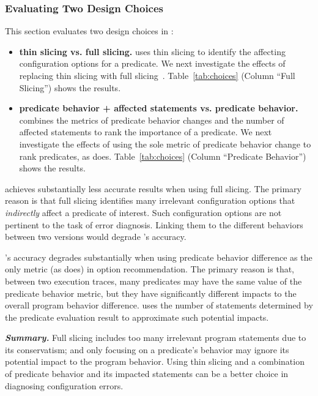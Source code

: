 \subsubsection{Evaluating Two Design Choices}
\label{sec:alternative}

This section evaluates two design choices in \ourtool:

\begin{itemize}
\item \textbf{thin slicing vs. full slicing.} \ourtool
uses thin slicing to identify the affecting configuration
options for a predicate. We next investigate the effects
of replacing thin slicing with full slicing~\cite{Horwitz:1988}.
Table~\ref{tab:choices} (Column ``Full Slicing'') shows the results.

\item \textbf{predicate behavior + affected statements vs. predicate behavior.}
\ourtool combines the metrics of predicate behavior changes
and the number of affected statements to rank the importance
of a predicate. We next
investigate the effects of using the sole metric of
predicate behavior change to rank predicates, as \prevtool does.
Table~\ref{tab:choices} (Column ``Predicate Behavior'') shows
the results. 
\end{itemize}

\ourtool achieves substantially less accurate results when
using full slicing. The primary reason is that full slicing
identifies many irrelevant configuration options that \textit{indirectly}
affect a predicate of interest. Such configuration options
are not pertinent to the task of error diagnosis. Linking them
to the different behaviors between two versions would degrade
\ourtool's accuracy.


\ourtool's accuracy degrades substantially when using
predicate behavior difference as the only metric (as \prevtool
does) in option recommendation.
The primary reason is that, between two execution traces,
many predicates may have the same value of the predicate
behavior metric, but they have significantly different
impacts to the overall program behavior difference. \ourtool
uses the number of statements determined by the predicate
evaluation result to approximate such potential impacts.

\vspace{1mm}
\noindent \textbf{\textit{Summary.}} Full slicing
includes too many irrelevant program statements due to its
conservatism; and only focusing on a predicate's behavior
may ignore its potential impact to the program behavior.
Using thin slicing and a combination of predicate behavior
and its impacted statements can be a better choice in diagnosing
configuration errors.

